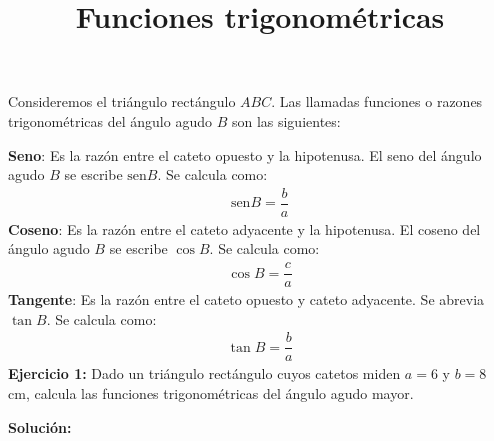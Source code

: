 \documentclass[12pt]{article}
\title{\vspace*{-2cm}Funciones trigonométricas \vspace{-5ex}}
\date{ }
\begin{document}
\maketitle
Consideremos el triángulo rectángulo $ABC$. Las llamadas funciones o razones trigonométricas del ángulo agudo $B$ son las siguientes:
\begin{figure}[H]
\centering
{}
\end{figure}

\noindent
\textbf{Seno}: Es la razón entre el cateto opuesto y la hipotenusa. El seno del ángulo agudo $B$ se escribe $\text{sen} B$. Se calcula como:
\begin{align*}
\text{sen} B = \dfrac{b}{a}
\end{align*}
\textbf{Coseno}: Es la razón entre el cateto adyacente y la hipotenusa. El coseno del ángulo agudo $B$ se escribe $\cos B$. Se calcula como:
\begin{align*}
\cos B = \dfrac{c}{a}
\end{align*}
\textbf{Tangente}: Es la razón entre el cateto opuesto y cateto adyacente. Se abrevia $\tan B$. Se calcula como:
\begin{align*}
\tan B = \dfrac{b}{a}
\end{align*}
\textbf{Ejercicio 1:} Dado un triángulo rectángulo cuyos catetos miden $a = 6$ y $b = 8$ cm, calcula las funciones trigonométricas del ángulo agudo mayor.
\begin{figure}[H]
\centering
{}
\end{figure}
\noindent
\textbf{Solución: }
\end{document}

